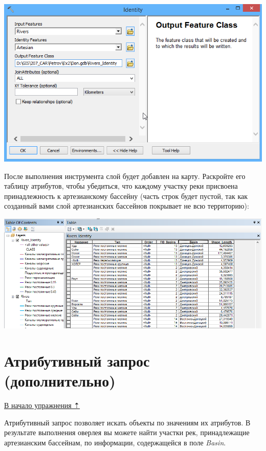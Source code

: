 \documentclass[]{book}
\theoremstyle{definition}
\theoremstyle{definition}
\theoremstyle{definition}
\theoremstyle{remark}
\begin{document}
\begin{enumerate}
  \includegraphics{images/Ex06/image20.png}
\end{enumerate}

После выполнения инструмента слой будет добавлен на карту. Раскройте его
таблицу атрибутов, чтобы убедиться, что каждому участку реки присвоена
принадлежность к артезианскому бассейну (часть строк будет пустой, так
как созданный вами слой артезианских бассейнов покрывает не всю
территорию):

\includegraphics{images/Ex06/image21.png}

\hypertarget{map-ref-hydrogeologic-attributes}{%
\section{Атрибутивный запрос
(дополнительно)}\label{map-ref-hydrogeologic-attributes}}

\protect\hyperlink{map-ref-hydrogeologic}{В начало упражнения ⇡}

Атрибутивный запрос позволяет искать объекты по значениям их атрибутов.
В результате выполнения оверлея вы можете найти участки рек,
принадлежащие артезианским бассейнам, по информации, содержащейся в поле
\emph{Basin}.
\end{document}
